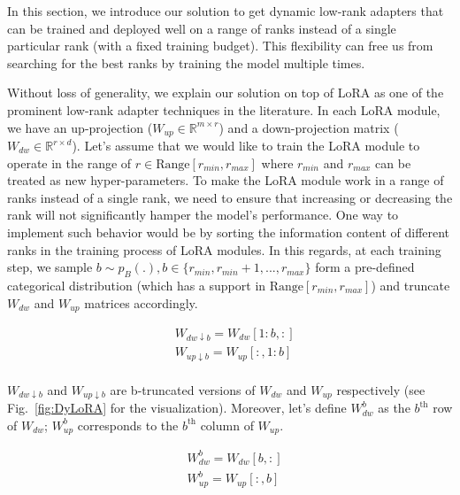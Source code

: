 In this section, we introduce our solution to get dynamic low-rank adapters that can be trained and deployed well on a range of ranks instead of a single particular rank (with a fixed training budget). This flexibility can free us from searching for the best ranks by training the model multiple times.

Without loss of generality, we explain our solution on top of LoRA as one of the prominent low-rank adapter techniques in the literature. In each LoRA module, we have an up-projection ($W_{up}\in \mathbb{R}^{m\times r}$) and a down-projection matrix ($W_{dw}\in \mathbb{R}^{r\times d}$). Let's assume that we would like to train the LoRA module to operate in the range of $r \in \text{Range}[r_{min}, r_{max}]$ where $r_{min}$ and $r_{max}$ can be treated as new hyper-parameters. To make the LoRA module work in a range of ranks instead of a single rank, we need to ensure that increasing or decreasing the rank will not significantly hamper the model's performance. One way to implement such behavior would be by sorting the information content of different ranks in the training process of LoRA modules. In this regards, at each training step, we sample $b\sim p_B(.), b\in\{r_{min}, r_{min}+1, ..., r_{max}\}$ form a pre-defined categorical distribution (which has a support in $\text{Range}[r_{min}, r_{max}]$) and truncate $W_{dw}$ and $W_{up}$ matrices accordingly.

\begin{equation}
\begin{split}
 & W_{dw \downarrow b} = W_{dw}[1:b,:] \\
 & W_{up \downarrow b} = W_{up}[:,1:b] \\
 \end{split}
\end{equation}

$W_{dw \downarrow b}$ and $W_{up \downarrow b}$ are b-truncated versions of $W_{dw}$ and $W_{up}$ respectively (see Fig.~\ref{fig:DyLoRA} for the visualization). Moreover, let's define $W_{dw}^b$ as the $b^\text{th}$ row of $W_{dw}$; $W_{up}^b$ corresponds to the $b^\text{th}$ column of $W_{up}$.

\begin{equation}
\begin{split}
 & W_{dw}^b = W_{dw}[b,:] \\
 & W_{up}^b = W_{up}[:,b] \\
\end{split}
\end{equation}

